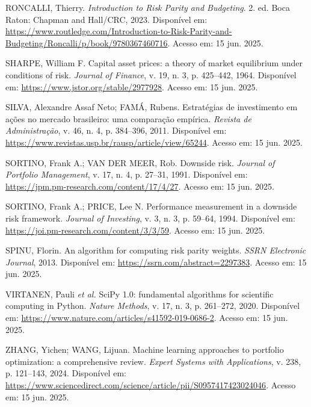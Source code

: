 \noindent
RONCALLI, Thierry. \textit{Introduction to Risk Parity and Budgeting}. 2. ed. Boca Raton: Chapman and Hall/CRC, 2023. Disponível em: \url{https://www.routledge.com/Introduction-to-Risk-Parity-and-Budgeting/Roncalli/p/book/9780367460716}. Acesso em: 15 jun. 2025.

\noindent
SHARPE, William F. Capital asset prices: a theory of market equilibrium under conditions of risk. \textit{Journal of Finance}, v. 19, n. 3, p. 425--442, 1964. Disponível em: \url{https://www.jstor.org/stable/2977928}. Acesso em: 15 jun. 2025.

\noindent
SILVA, Alexandre Assaf Neto; FAMÁ, Rubens. Estratégias de investimento em ações no mercado brasileiro: uma comparação empírica. \textit{Revista de Administração}, v. 46, n. 4, p. 384--396, 2011. Disponível em: \url{https://www.revistas.usp.br/rausp/article/view/65244}. Acesso em: 15 jun. 2025.

\noindent
SORTINO, Frank A.; VAN DER MEER, Rob. Downside risk. \textit{Journal of Portfolio Management}, v. 17, n. 4, p. 27--31, 1991. Disponível em: \url{https://jpm.pm-research.com/content/17/4/27}. Acesso em: 15 jun. 2025.

\noindent
SORTINO, Frank A.; PRICE, Lee N. Performance measurement in a downside risk framework. \textit{Journal of Investing}, v. 3, n. 3, p. 59--64, 1994. Disponível em: \url{https://joi.pm-research.com/content/3/3/59}. Acesso em: 15 jun. 2025.

\noindent
SPINU, Florin. An algorithm for computing risk parity weights. \textit{SSRN Electronic Journal}, 2013. Disponível em: \url{https://ssrn.com/abstract=2297383}. Acesso em: 15 jun. 2025.

\noindent
VIRTANEN, Pauli \textit{et al.} SciPy 1.0: fundamental algorithms for scientific computing in Python. \textit{Nature Methods}, v. 17, n. 3, p. 261--272, 2020. Disponível em: \url{https://www.nature.com/articles/s41592-019-0686-2}. Acesso em: 15 jun. 2025.

\noindent
ZHANG, Yichen; WANG, Lijuan. Machine learning approaches to portfolio optimization: a comprehensive review. \textit{Expert Systems with Applications}, v. 238, p. 121--143, 2024. Disponível em: \url{https://www.sciencedirect.com/science/article/pii/S0957417423024046}. Acesso em: 15 jun. 2025.